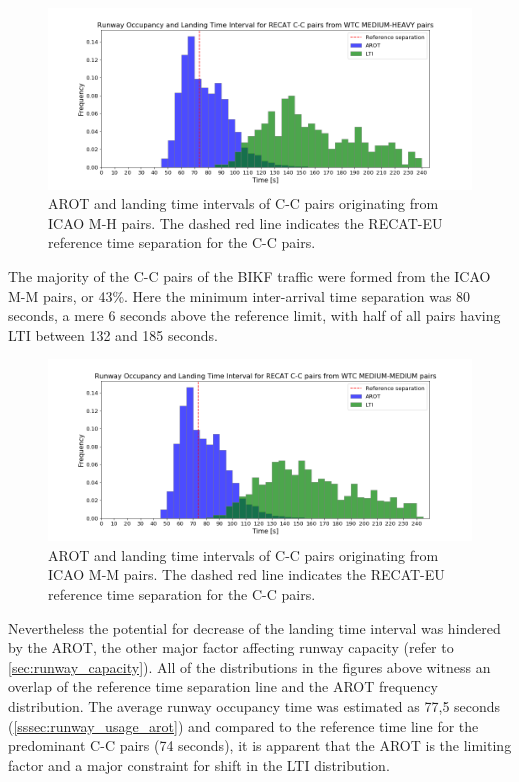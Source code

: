 \begin{figure}[h]
    \centering
    \includegraphics[width=1\textwidth]{graphics/fig_CC_from_MH_pairs_time_sep.png}
    \caption[AROT and LTI of C-C pairs originating from ICAO M-H pairs]{AROT and landing time intervals of C-C pairs originating from ICAO M-H pairs. The dashed red line indicates the RECAT-EU reference time separation for the C-C pairs.}
    \label{fig:CC_from_MH_pairs_time_sep}
\end{figure}

The majority of the C-C pairs of the BIKF traffic were formed from the ICAO M-M pairs, or 43\%. Here the minimum inter-arrival time separation was 80 seconds, a mere 6 seconds above the reference limit, with half of all pairs having LTI between 132 and 185 seconds.

\begin{figure}[h]
    \centering
    \includegraphics[width=1\textwidth]{graphics/fig_CC_from_MM_pairs_time_sep.png}
    \caption[AROT and LTI of C-C pairs originating from ICAO M-M pairs]{AROT and landing time intervals of C-C pairs originating from ICAO M-M pairs. The dashed red line indicates the RECAT-EU reference time separation for the C-C pairs.}
    \label{fig:CC_from_MM_pairs_time_sep}
\end{figure}

Nevertheless the potential for decrease of the landing time interval was hindered by the AROT, the other major factor affecting runway capacity (refer to \ref{sec:runway_capacity}). All of the distributions in the figures above witness an overlap of the reference time separation line and the AROT frequency distribution. The average runway occupancy time was estimated as 77,5 seconds (\ref{sssec:runway_usage_arot}) and compared to the reference time line for the predominant C-C pairs (74 seconds), it is apparent that the AROT is the limiting factor and a major constraint for shift in the LTI distribution.









